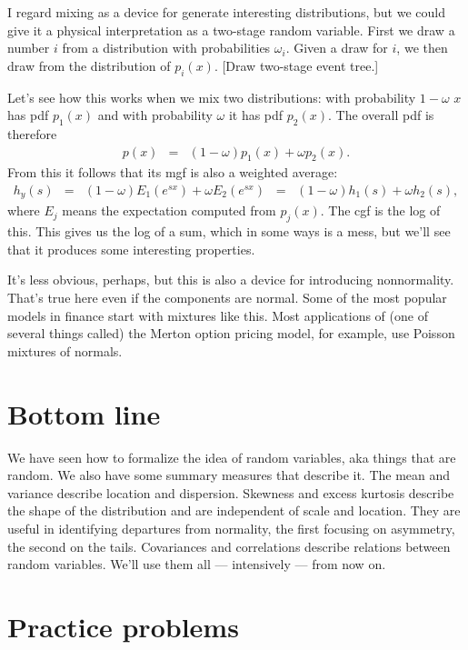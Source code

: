 \documentclass[11pt]{article}
\begin{document}
I regard mixing as a device for generate interesting distributions,
but we could give it a physical interpretation as a two-stage random variable.
First we draw a number $i$ from a distribution with probabilities $\omega_i$.
Given a draw for $i$, we then draw from the distribution of $p_i(x)$.
[Draw two-stage event tree.]

Let's see how this works when we mix two distributions:
with probability $1-\omega$ $x$ has pdf $p_1(x)$
and with probability $\omega$ it has pdf $p_2(x)$.
The overall pdf is therefore
\begin{eqnarray*}
    p (x) &=& (1-\omega) p_1(x) + \omega p_2 (x) .
\end{eqnarray*}
From this it follows that its mgf is also a weighted average:
\begin{eqnarray*}
    h_y(s) &=& (1-\omega) E_1 \left( e^{sx} \right)
                + \omega  E_2 \left( e^{sx} \right)
            \;\;=\;\; (1-\omega) h_1(s) + \omega h_2 (s) ,
\end{eqnarray*}
where $E_j$ means the expectation computed from $p_j(x)$.
The cgf is the log of this.
This gives us the log of a sum, which in some ways is a mess,
but we'll see that it produces some interesting properties.

It's less obvious, perhaps, but this is also a device for introducing nonnormality.
That's true here even if the components are normal.
Some of the most popular models in finance start with mixtures like this.
Most applications of (one of several things called) the Merton option pricing model,
for example, use Poisson mixtures of normals.


\section*{Bottom line}

We have seen how to formalize the idea of random variables,
aka things that are random.
We also have some summary measures that describe it.
The mean and variance describe location and dispersion.
Skewness and excess kurtosis describe the shape of the distribution
and are independent of scale and location.
They are useful in identifying departures from normality,
the first focusing on asymmetry, the second on the tails.
Covariances and correlations describe
relations between random variables.
We'll use them all --- intensively --- from now on.


\section*{Practice problems}
\end{document}
